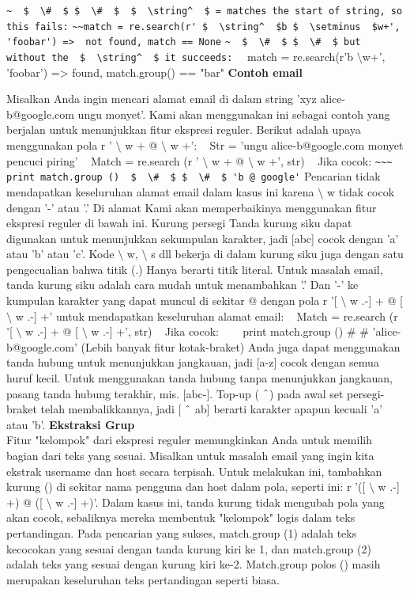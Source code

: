 \begin{enumerate}
\begin{enumerate}
\verb|~  $  \#  $ $  \#  $  $  \string^  $ = matches the start of string, so this fails:|
\verb|~~match = re.search(r' $  \string^  $b $  \setminus  $w+', 'foobar') =>  not found, match == None|
\verb|~  $  \#  $ $  \#  $ but without the  $  \string^  $ it succeeds:|
~~match = re.search(r'b $  \setminus  $w+', 'foobar') =>  found, match.group() == "bar"
{\fontsize{14pt}{14pt}\selectfont \textbf{Contoh email} \\} \par
Misalkan Anda ingin mencari alamat email di dalam string 'xyz alice-b@google.com ungu monyet'. Kami akan menggunakan ini sebagai contoh yang berjalan untuk menunjukkan fitur ekspresi reguler. Berikut adalah upaya menggunakan pola r ' $  \setminus  $ w + @  $  \setminus  $ w +':
~ Str = 'ungu alice-b@google.com monyet pencuci piring'
~ Match = re.search (r ' $  \setminus  $ w + @  $  \setminus  $ w +', str)
~ Jika cocok:
\verb|~~~ print match.group ()  $  \#  $ $  \#  $ 'b @ google'|
Pencarian tidak mendapatkan keseluruhan alamat email dalam kasus ini karena  $  \setminus  $ w tidak cocok dengan '-' atau '.' Di alamat Kami akan memperbaikinya menggunakan fitur ekspresi reguler di bawah ini. Kurung persegi Tanda kurung siku dapat digunakan untuk menunjukkan sekumpulan karakter, jadi [abc] cocok dengan 'a' atau 'b' atau 'c'. Kode  $  \setminus  $ w,  $  \setminus  $ s dll bekerja di dalam kurung siku juga dengan satu pengecualian bahwa titik (.) Hanya berarti titik literal. Untuk masalah email, tanda kurung siku adalah cara mudah untuk menambahkan '.' Dan '-' ke kumpulan karakter yang dapat muncul di sekitar @ dengan pola r '[ $  \setminus  $ w .-] + @ [ $  \setminus  $ w .-] +' untuk mendapatkan keseluruhan alamat email:
~ Match = re.search (r '[ $  \setminus  $ w .-] + @ [ $  \setminus  $ w .-] +', str)
~ Jika cocok:
~~~ print match.group ()  $  \#  $ $  \#  $ 'alice-b@google.com'
(Lebih banyak fitur kotak-braket) Anda juga dapat menggunakan tanda hubung untuk menunjukkan jangkauan, jadi [a-z] cocok dengan semua huruf kecil. Untuk menggunakan tanda hubung tanpa menunjukkan jangkauan, pasang tanda hubung terakhir, mis. [abc-]. Top-up ( $  \string^  $) pada awal set persegi-braket telah membalikkannya, jadi [ $  \string^  $ ab] berarti karakter apapun kecuali 'a' atau 'b'.
{\fontsize{14pt}{14pt}\selectfont \textbf{Ekstraksi Grup} \\}
Fitur "kelompok" dari ekspresi reguler memungkinkan Anda untuk memilih bagian dari teks yang sesuai. Misalkan untuk masalah email yang ingin kita ekstrak username dan host secara terpisah. Untuk melakukan ini, tambahkan kurung () di sekitar nama pengguna dan host dalam pola, seperti ini: r '([ $  \setminus  $ w .-] +) @ ([ $  \setminus  $ w .-] +)'. Dalam kasus ini, tanda kurung tidak mengubah pola yang akan cocok, sebaliknya mereka membentuk "kelompok" logis dalam teks pertandingan. Pada pencarian yang sukses, match.group (1) adalah teks kecocokan yang sesuai dengan tanda kurung kiri ke 1, dan match.group (2) adalah teks yang sesuai dengan kurung kiri ke-2. Match.group polos () masih merupakan keseluruhan teks pertandingan seperti biasa.

\end{enumerate}
\end{enumerate}
